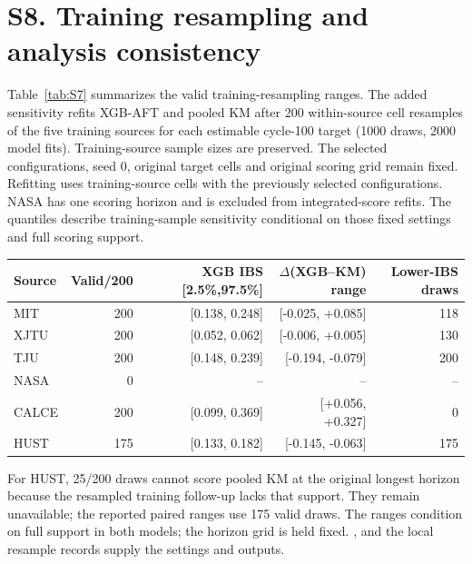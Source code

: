 \documentclass[10pt,a4paper]{article}
\begin{document}
\section*{S8. Training resampling and analysis consistency}
Table~\ref{tab:S7} summarizes the valid training-resampling ranges.
The added sensitivity refits XGB-AFT and pooled KM after 200 within-source cell resamples of the five training sources for each estimable cycle-100 target (1000 draws, 2000 model fits). Training-source sample sizes are preserved. The selected configurations, seed 0, original target cells and original scoring grid remain fixed. Refitting uses training-source cells with the previously selected configurations. NASA has one scoring horizon and is excluded from integrated-score refits. The quantiles describe training-sample sensitivity conditional on those fixed settings and full scoring support.
\begin{center}\small
\begin{minipage}{\linewidth}\centering
{}\label{tab:S7}
\begin{tabular}{lrrrr}\toprule
Source & Valid/200 & XGB IBS [2.5\%,97.5\%] & $\Delta$(XGB--KM) range & Lower-IBS draws\\\midrule
MIT & 200 & [0.138, 0.248] & [-0.025, +0.085] & 118\\
XJTU & 200 & [0.052, 0.062] & [-0.006, +0.005] & 130\\
TJU & 200 & [0.148, 0.239] & [-0.194, -0.079] & 200\\
NASA & 0 & -- & -- & --\\
CALCE & 200 & [0.099, 0.369] & [+0.056, +0.327] & 0\\
HUST & 175 & [0.133, 0.182] & [-0.145, -0.063] & 175\\
\bottomrule\end{tabular}\end{minipage}
\end{center}
For HUST, 25/200 draws cannot score pooled KM at the original longest horizon because the resampled training follow-up lacks that support. They remain unavailable; the reported paired ranges use 175 valid draws. The ranges condition on full support in both models; the horizon grid is held fixed. ,  and the local resample records supply the settings and outputs.
\end{document}
